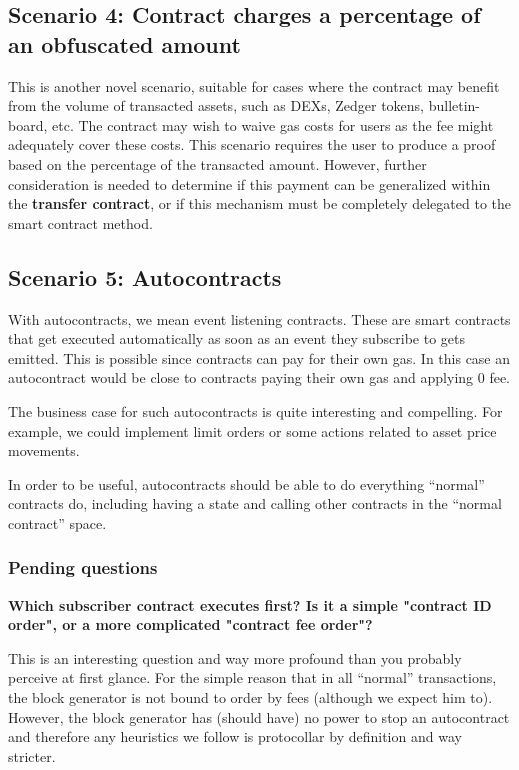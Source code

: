 \documentclass[twocolumn, nofootinbib]{revtex4-2} %
\newcommand{\emphasize}[1]{\textbf{#1}\xspace}
\newcommand{\transfercontract}{\emphasize{transfer contract}}
\begin{document}
    \subsection{Scenario 4: Contract charges a percentage of an obfuscated amount}\label{sec:specifications:scenario-4}
    This is another novel scenario, suitable for cases where the contract may
    benefit from the volume of transacted assets, such as DEXs, Zedger tokens,
    bulletin-board, etc.
    The contract may wish to waive gas costs for users as the fee might
    adequately cover these costs.
    This scenario requires the user to produce a proof based on the percentage
    of the transacted amount.
    However, further consideration is needed to determine if this payment can
    be generalized within the \transfercontract, or if this mechanism must be
    completely delegated to the smart contract method.

    \subsection{Scenario 5: Autocontracts}\label{sec:specifications:scenario-5}

    With autocontracts, we mean event listening contracts.
    These are smart contracts that get executed automatically as soon as an
    event they subscribe to gets emitted.
    This is possible since contracts can pay for their own gas.
    In this case an autocontract would be close to contracts paying their own
    gas and applying 0 fee.

    The business case for such autocontracts is quite interesting and
    compelling.
    For example, we could implement limit orders or some actions related to
    asset price movements.

    In order to be useful, autocontracts should be able to do everything
    ``normal'' contracts do, including having a state and calling other
    contracts in the ``normal contract'' space.

    \subsubsection{Pending questions}\label{sec:specifications:scenario-5:pending-questions}
    \textbf{Which subscriber contract executes first? Is it a simple "contract
            ID order", or a more complicated "contract fee order"?}

    This is an interesting question and way more profound than you probably
    perceive at first glance.
    For the simple reason that in all ``normal'' transactions, the block
    generator is not bound to order by fees (although we expect him to).
    However, the block generator has (should have) no power to stop an
    autocontract and therefore any heuristics we follow is protocollar by
    definition and way stricter.
\end{document}
